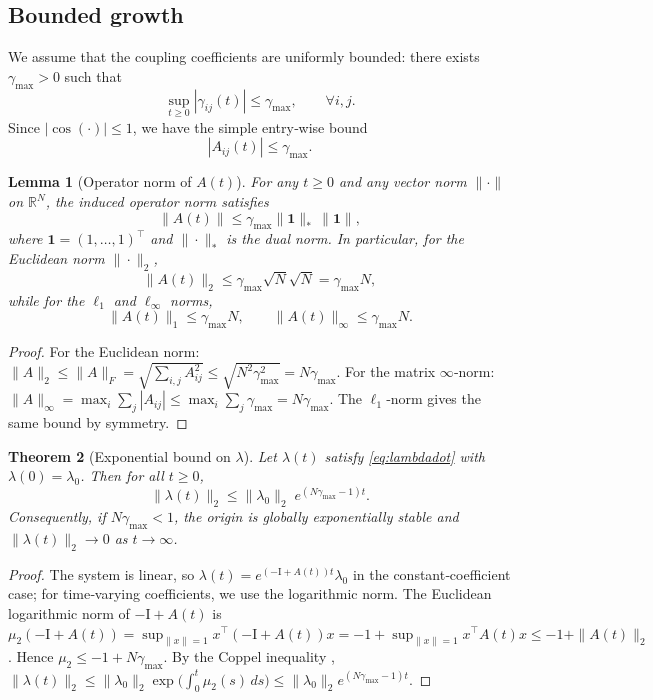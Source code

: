 \documentclass[11pt,a4paper]{article}
\newtheorem{theorem}{Theorem}[section]
\newtheorem{lemma}[theorem]{Lemma}
\theoremstyle{definition}
\theoremstyle{remark}
\newcommand{\R}{\mathbb{R}}
\newcommand{\abs}[1]{|#1|}
\begin{document}
\subsection{Bounded growth}
We assume that the coupling coefficients are uniformly bounded: there exists \(\gamma_{\max}>0\) such that
\[
\sup_{t\ge 0} \abs{\gamma_{ij}(t)} \le \gamma_{\max},\qquad \forall i,j.
\]
Since \(\abs{\cos(\cdot)}\le 1\), we have the simple entry‑wise bound
\[
\abs{A_{ij}(t)} \le \gamma_{\max}.
\]

\begin{lemma}[Operator norm of \(A(t)\)]
For any \(t\ge 0\) and any vector norm \(\|\cdot\|\) on \(\R^N\), the induced operator norm satisfies
\[
\|A(t)\| \le \gamma_{\max} \| \mathbf{1} \|_* \, \| \mathbf{1} \|,
\]
where \(\mathbf{1} = (1,\dots,1)^\top\) and \(\|\cdot\|_*\) is the dual norm.  
In particular, for the Euclidean norm \(\|\cdot\|_2\),
\[
\|A(t)\|_2 \le \gamma_{\max} \sqrt{N} \sqrt{N} = \gamma_{\max} N,
\]
while for the \(\ell_1\) and \(\ell_\infty\) norms,
\[
\|A(t)\|_1 \le \gamma_{\max} N,\qquad \|A(t)\|_\infty \le \gamma_{\max} N.
\]
\end{lemma}
\begin{proof}
For the Euclidean norm: \(\|A\|_2 \le \|A\|_F = \sqrt{\sum_{i,j} A_{ij}^2} \le \sqrt{N^2\gamma_{\max}^2} = N\gamma_{\max}\).  
For the matrix \(\infty\)‑norm: \(\|A\|_\infty = \max_i \sum_j |A_{ij}| \le \max_i \sum_j \gamma_{\max} = N\gamma_{\max}\).  
The \(\ell_1\)‑norm gives the same bound by symmetry.
\end{proof}

\begin{theorem}[Exponential bound on \(\lambda\)]
Let \(\lambda(t)\) satisfy \eqref{eq:lambdadot} with \(\lambda(0)=\lambda_0\).  
Then for all \(t\ge 0\),
\[
\|\lambda(t)\|_2 \le \|\lambda_0\|_2 \; e^{(N\gamma_{\max}-1)t}.
\]
Consequently, if \(N\gamma_{\max} < 1\), the origin is globally exponentially stable and \(\|\lambda(t)\|_2 \to 0\) as \(t\to\infty\).
\end{theorem}
\begin{proof}
The system is linear, so \(\lambda(t) = e^{(-\mathrm{I}+A(t))t}\lambda_0\) in the constant‑coefficient case; for time‑varying coefficients, we use the logarithmic norm.  
The Euclidean logarithmic norm of \(-\mathrm{I}+A(t)\) is \(\mu_2(-\mathrm{I}+A(t)) = \sup_{\|x\|=1} x^\top(-\mathrm{I}+A(t))x = -1 + \sup_{\|x\|=1} x^\top A(t)x \le -1 + \|A(t)\|_2\).  
Hence \(\mu_2 \le -1 + N\gamma_{\max}\).  
By the Coppel inequality \cite{coppel1965}, \(\|\lambda(t)\|_2 \le \|\lambda_0\|_2 \exp\!\bigl(\int_0^t \mu_2(s)\,ds\bigr) \le \|\lambda_0\|_2 e^{(N\gamma_{\max}-1)t}\).
\end{proof}
\end{document}
